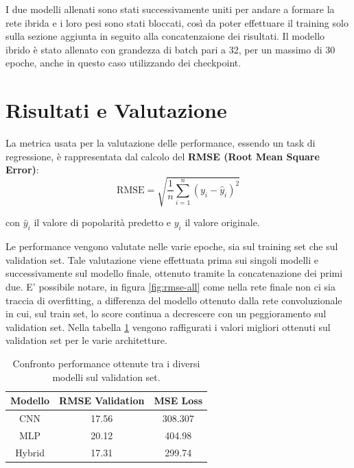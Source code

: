     I due modelli allenati sono stati successivamente uniti per andare a formare la rete ibrida e i loro pesi sono stati bloccati, così da poter effettuare il training 
    solo sulla sezione aggiunta in seguito alla concatenzaione dei risultati.
    Il modello ibrido è stato allenato con grandezza di batch pari a 32, per un massimo di 30 epoche, anche in questo caso utilizzando dei checkpoint.


\section{Risultati e Valutazione}

La metrica usata per la valutazione delle performance, essendo un task di regressione, è rappresentata dal calcolo del \textbf{RMSE (Root Mean Square Error)}:
\begin{equation}
    \textrm{RMSE} = \sqrt{\frac{1}{n} \sum_{i=1}^{n} (y_i - \hat{y}_i)^2} 
\end{equation}

con $\hat{y}_i$ il valore di popolarità predetto e $y_i$ il valore originale.


Le performance vengono valutate nelle varie epoche, sia sul training set che sul validation set. Tale valutazione viene effettuata prima sui singoli modelli e successivamente sul modello finale, ottenuto tramite la concatenazione dei primi due. E' possibile notare, in figura \ref{fig:rmse-all} come nella rete finale non ci sia traccia di overfitting, a differenza del modello ottenuto dalla rete convoluzionale in cui, sul train set, lo score continua a decrescere con un peggioramento sul validation set. 
Nella tabella \ref{table:rmse} vengono raffigurati i valori migliori ottenuti sul validation set per le varie architetture.

\begin{table}[H]
\caption{Confronto performance ottenute tra i diversi modelli sul validation set.}
  \vspace{3mm}
\centering
\begin{tabular}{|c|c|c|}
\hline
\textbf{Modello} & \textbf{RMSE Validation} & \textbf{MSE Loss} \\ \hline \hline
CNN     & 17.56           & 308.307  \\ \hline 
MLP     & 20.12           & 404.98   \\ \hline 
Hybrid  & 17.31           & 299.74   \\ \hline
\end{tabular}
\label{table:rmse}
\end{table}

